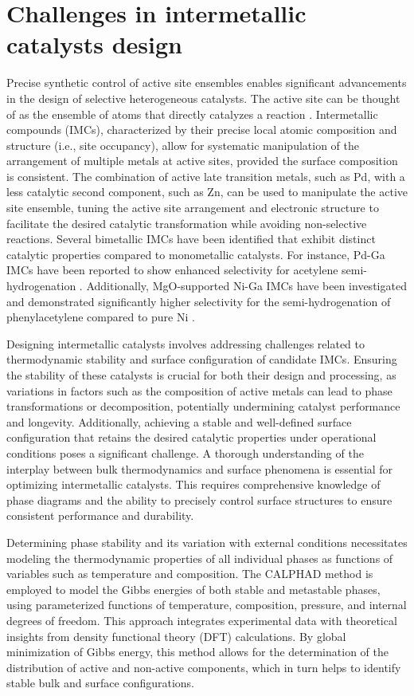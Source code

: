 \section{Challenges in intermetallic catalysts design} \label{intro:sec:catalysts}
Precise synthetic control of active site ensembles enables significant advancements in the design of selective heterogeneous catalysts. The active site can be thought of as the ensemble of atoms that directly catalyzes a reaction \cite{greeley2012active}. Intermetallic compounds (IMCs), characterized by their precise local atomic composition and structure (i.e., site occupancy), allow for systematic manipulation of the arrangement of multiple metals at active sites, provided the surface composition is consistent. The combination of active late transition metals, such as Pd, with a less catalytic second component, such as Zn, can be used to manipulate the active site ensemble, tuning the active site arrangement and electronic structure to facilitate the desired catalytic transformation while avoiding non-selective reactions. Several bimetallic IMCs have been identified that exhibit distinct catalytic properties compared to monometallic catalysts. For instance, Pd-Ga IMCs have been reported to show enhanced selectivity for acetylene semi-hydrogenation \cite{kovnir2007new, prinz2014adsorption}. Additionally, MgO-supported Ni-Ga IMCs have been investigated and demonstrated significantly higher selectivity for the semi-hydrogenation of phenylacetylene compared to pure Ni \cite{li2014nickel}.

Designing intermetallic catalysts involves addressing challenges related to thermodynamic stability and surface configuration of candidate IMCs. Ensuring the stability of these catalysts is crucial for both their design and processing, as variations in factors such as the composition of active metals can lead to phase transformations or decomposition, potentially undermining catalyst performance and longevity. Additionally, achieving a stable and well-defined surface configuration that retains the desired catalytic properties under operational conditions poses a significant challenge. A thorough understanding of the interplay between bulk thermodynamics and surface phenomena is essential for optimizing intermetallic catalysts. This requires comprehensive knowledge of phase diagrams and the ability to precisely control surface structures to ensure consistent performance and durability.

Determining phase stability and its variation with external conditions necessitates modeling the thermodynamic properties of all individual phases as functions of variables such as temperature and composition. The CALPHAD method is employed to model the Gibbs energies of both stable and metastable phases, using parameterized functions of temperature, composition, pressure, and internal degrees of freedom. This approach integrates experimental data with theoretical insights from density functional theory (DFT) calculations. By global minimization of Gibbs energy, this method allows for the determination of the distribution of active and non-active components, which in turn helps to identify stable bulk and surface configurations.

